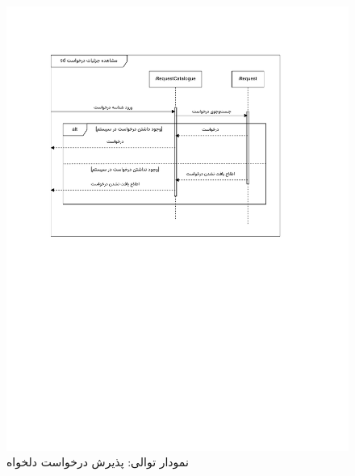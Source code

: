 \begin{figure}[ht!]
	\centering
	\includegraphics[scale=0.8, page=4]{figs/OOD-Sequence-2.pdf}
	\caption{نمودار توالی: پذیرش درخواست دلخواه}
\end{figure}
\FloatBarrier
\newpage

